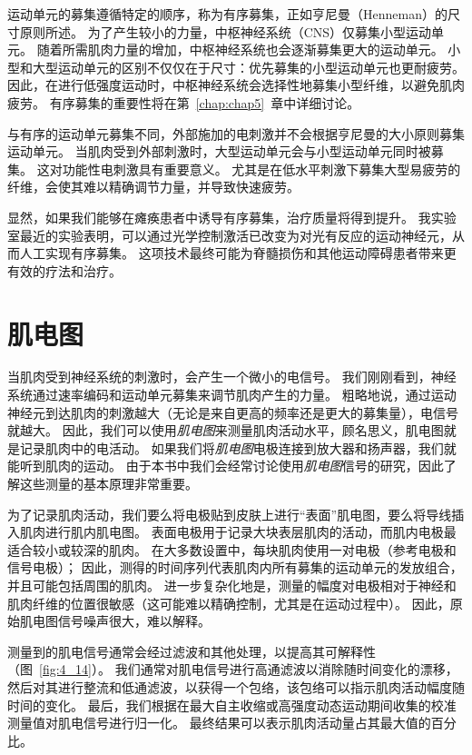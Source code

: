 运动单元的募集遵循特定的顺序，称为有序募集，正如亨尼曼（Henneman）的尺寸原则\cite{henneman1965functional}所述。
为了产生较小的力量，中枢神经系统（CNS）仅募集小型运动单元。
随着所需肌肉力量的增加，中枢神经系统也会逐渐募集更大的运动单元。
小型和大型运动单元的区别不仅仅在于尺寸：优先募集的小型运动单元也更耐疲劳。
因此，在进行低强度运动时，中枢神经系统会选择性地募集小型纤维，以避免肌肉疲劳。
有序募集的重要性将在第~\ref{chap:chap5}~章中详细讨论。


与有序的运动单元募集不同，外部施加的电刺激并不会根据亨尼曼的大小原则募集运动单元。
当肌肉受到外部刺激时，大型运动单元会与小型运动单元同时被募集\cite{gregory2005recruitment}。
这对功能性电刺激具有重要意义。
尤其是在低水平刺激下募集大型易疲劳的纤维，会使其难以精确调节力量，并导致快速疲劳。


显然，如果我们能够在瘫痪患者中诱导有序募集，治疗质量将得到提升。
我实验室最近的实验表明，可以通过光学控制激活已改变为对光有反应的运动神经元，从而人工实现有序募集\cite{llewellyn2010orderly}。
这项技术最终可能为脊髓损伤和其他运动障碍患者带来更有效的疗法和治疗。



\section{肌电图}

当肌肉受到神经系统的刺激时，会产生一个微小的电信号。
我们刚刚看到，神经系统通过速率编码和运动单元募集来调节肌肉产生的力量。
粗略地说，通过运动神经元到达肌肉的刺激越大（无论是来自更高的频率还是更大的募集量），电信号就越大。
因此，我们可以使用\textit{肌电图}来测量肌肉活动水平，顾名思义，肌电图就是记录肌肉中的电活动。
如果我们将\textit{肌电图}电极连接到放大器和扬声器，我们就能听到肌肉的运动。
由于本书中我们会经常讨论使用\textit{肌电图}信号的研究，因此了解这些测量的基本原理非常重要。


为了记录肌肉活动，我们要么将电极贴到皮肤上进行“表面”肌电图，要么将导线插入肌肉进行肌内肌电图。
表面电极用于记录大块表层肌肉的活动，而肌内电极最适合较小或较深的肌肉。
在大多数设置中，每块肌肉使用一对电极（参考电极和信号电极）；
因此，测得的时间序列代表肌肉内所有募集的运动单元的发放组合，并且可能包括周围的肌肉。
进一步复杂化地是，测量的幅度对电极相对于神经和肌肉纤维的位置很敏感（这可能难以精确控制，尤其是在运动过程中）。
因此，原始肌电图信号噪声很大，难以解释。


测量到的肌电信号通常会经过滤波和其他处理，以提高其可解释性（图~\ref{fig:4_14}）。
我们通常对肌电信号进行高通滤波以消除随时间变化的漂移，然后对其进行整流和低通滤波，以获得一个包络，该包络可以指示肌肉活动幅度随时间的变化。
最后，我们根据在最大自主收缩或高强度动态运动期间收集的校准测量值对肌电信号进行归一化。
最终结果可以表示肌肉活动量占其最大值的百分比。


